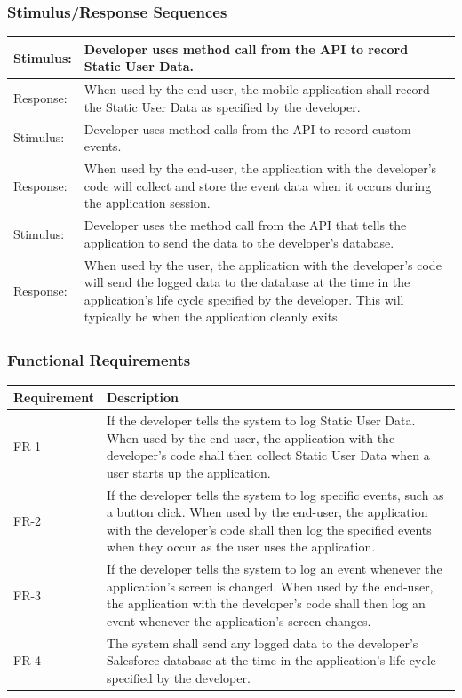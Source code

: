 \documentclass[12pt,oneside,letterpaper]{article}
\begin{document}
\subsubsection{Stimulus/Response Sequences}

\begin{longtable}{|l|p{3.8in}|}
\hline
Stimulus:&Developer uses method call from the API to record Static User Data.\\
\hline
Response:&When used by the end-user, the mobile application shall record the Static User Data as specified by the developer.\\
\hline
Stimulus:&Developer uses method calls from the API to record custom events.\\
\hline
Response:&When used by the end-user, the application with the developer's code will collect and store the 
event data when it occurs during the application session.\\
\hline
Stimulus:&Developer uses the method call from the API that tells 
the application to send the data to the developer's database.\\
\hline
Response:&When used by the user, the application with the developer's code will send the logged data to 
the database at the time in the application's life cycle specified by 
the developer. This will typically be when the application cleanly exits.\\
\hline
\end{longtable}
 
\subsubsection{Functional Requirements}

\begin{longtable}{|l|p{3.8in}|}
\hline
\textbf{Requirement}&\textbf{Description}\\
\hline
FR-1&If the developer tells the system to log Static User Data. When used by the end-user, 
the application with the developer's code shall then collect Static User Data when 
a user starts up the application.\\
\hline
FR-2&If the developer tells the system to log specific events, such as 
a button click. When used by the end-user, the application with the developer's code shall then log the 
specified events when they occur as the user uses the application.\\
\hline
FR-3&If the developer tells the system to log an event whenever the 
application's screen is changed. When used by the end-user, the application with the developer's code shall then log an event whenever 
the application's screen changes.\\
\hline
FR-4&The system shall send any logged data to the developer's 
Salesforce database at the time in the application's life cycle 
specified by the developer.\\
\hline
\end{longtable}
\end{document}
